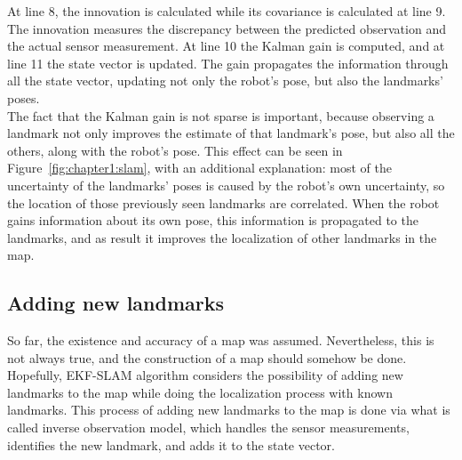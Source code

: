 At line 8, the innovation is calculated while its covariance is calculated at line 9. The innovation measures the discrepancy between the predicted observation and the actual sensor measurement. At line 10 the Kalman gain is computed, and at line 11 the state vector is updated. The gain propagates the information through all the state vector, updating not only the robot's pose, but also the landmarks' poses.\\

The fact that the Kalman gain is not sparse is important, because observing a landmark not only improves the estimate of that landmark's pose, but also all the others, along with the robot's pose. This effect can be seen in Figure~\ref{fig:chapter1:slam}, with an additional explanation: most of the uncertainty of the landmarks' poses is caused by the robot's own uncertainty, so the location of those previously seen landmarks are correlated. When the robot gains information about its own pose, this information is propagated to the landmarks, and as result it improves the localization of other landmarks in the map.

\subsection{Adding new landmarks}
\label{subsec:chapter1:slam:ekfslam:addlandmarks}
So far, the existence and accuracy of a map was assumed. Nevertheless, this is not always true, and the construction of a map should somehow be done. Hopefully, EKF-SLAM algorithm considers the possibility of adding new landmarks to the map while doing the localization process with known landmarks. This process of adding new landmarks to the map is done via what is called inverse observation model, which handles the sensor measurements, identifies the new landmark, and adds it to the state vector.\\


